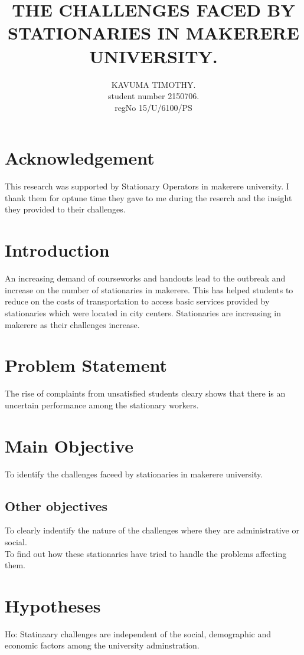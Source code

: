 \documentclass[a4paper,10pt]{article}
\begin{document}
\title{THE CHALLENGES FACED BY STATIONARIES IN MAKERERE UNIVERSITY.}
\author{
KAVUMA TIMOTHY.\\
student number 2150706.\\
regNo  15/U/6100/PS
}


\maketitle
\newpage
\section{Acknowledgement}
This research was supported by Stationary Operators in makerere university. I thank  them for optune time they gave to me during the reserch  and the insight they provided to their challenges.

\tableofcontents


\section{Introduction}
An increasing demand of courseworks and handouts lead to the outbreak and increase on the number of stationaries in makerere. This has helped students to reduce on the costs of transportation to access basic services provided by stationaries which were located in city centers. Stationaries are increasing in makerere as their challenges increase.

\section{ Problem Statement}
The rise of complaints from unsatisfied students cleary shows that there is an uncertain performance among the stationary workers. 
\section{Main Objective}
To identify the challenges faceed by stationaries in makerere university.
\subsection{Other objectives}
To clearly indentify the nature of the challenges where they are administrative or social.\\
To find out how these stationaries have tried to handle the problems affecting them.

\section{Hypotheses}
Ho: Statinaary challenges are independent of the social, demographic and economic factors among the university adminstration.
\end{document}
